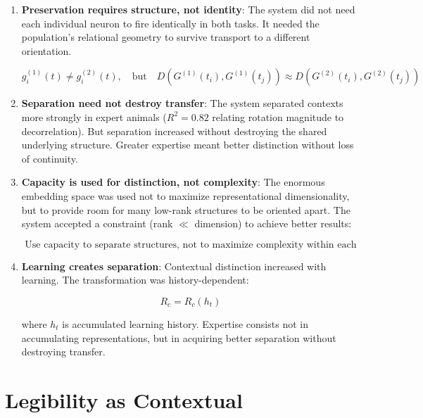 \documentclass[12pt]{article}
\begin{document}
\begin{enumerate}

\item \textbf{Preservation requires structure, not identity}: The system did not need each individual neuron to fire identically in both tasks. It needed the population's relational geometry to survive transport to a different orientation.

\begin{equation}
g_i^{(1)}(t) \neq g_i^{(2)}(t), \quad \text{but} \quad D(G^{(1)}(t_i), G^{(1)}(t_j)) \approx D(G^{(2)}(t_i), G^{(2)}(t_j))
\end{equation}

\item \textbf{Separation need not destroy transfer}: The system separated contexts more strongly in expert animals ($R^2 = 0.82$ relating rotation magnitude to decorrelation). But separation increased without destroying the shared underlying structure. Greater expertise meant better distinction without loss of continuity.

\item \textbf{Capacity is used for distinction, not complexity}: The enormous embedding space was used not to maximize representational dimensionality, but to provide room for many low-rank structures to be oriented apart. The system accepted a constraint (rank $\ll$ dimension) to achieve better results:

\begin{equation}
\boxed{\text{Use capacity to separate structures, not to maximize complexity within each}}
\end{equation}

\item \textbf{Learning creates separation}: Contextual distinction increased with learning. The transformation was history-dependent:

\begin{equation}
R_c = R_c(h_t)
\end{equation}

where $h_t$ is accumulated learning history. Expertise consists not in accumulating representations, but in acquiring better separation without destroying transfer.

\end{enumerate}

\section{Legibility as Contextual}
\end{document}
